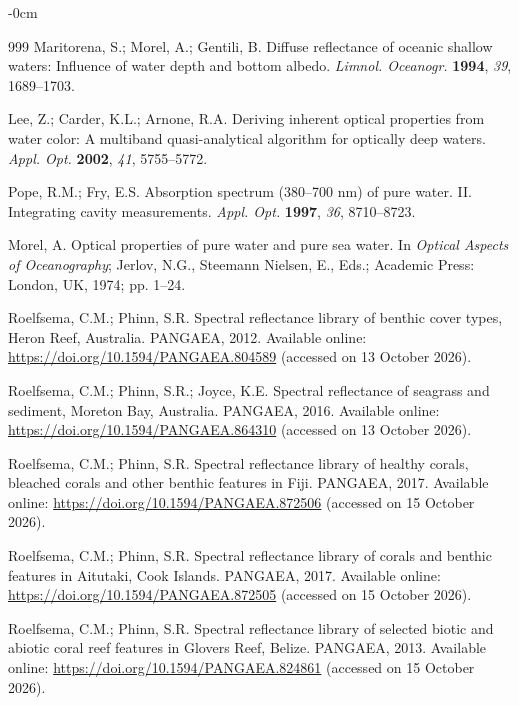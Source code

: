 \documentclass[remotesensing,article,submit,pdftex]{Definitions/mdpi}
\begin{document}
\begin{adjustwidth}{-\extralength}{0cm}
\begin{thebibliography}{999}
Maritorena, S.; Morel, A.; Gentili, B. Diffuse reflectance of oceanic shallow waters: Influence of water depth and bottom albedo. {\em Limnol. Oceanogr.} {\bf 1994}, {\em 39}, 1689--1703.

Lee, Z.; Carder, K.L.; Arnone, R.A. Deriving inherent optical properties from water color: A multiband quasi-analytical algorithm for optically deep waters. {\em Appl. Opt.} {\bf 2002}, {\em 41}, 5755--5772.

Pope, R.M.; Fry, E.S. Absorption spectrum (380--700 nm) of pure water. II. Integrating cavity measurements. {\em Appl. Opt.} {\bf 1997}, {\em 36}, 8710--8723.

Morel, A. Optical properties of pure water and pure sea water. In {\em Optical Aspects of Oceanography}; Jerlov, N.G., Steemann Nielsen, E., Eds.; Academic Press: London, UK, 1974; pp. 1--24.

Roelfsema, C.M.; Phinn, S.R. Spectral reflectance library of benthic cover types, Heron Reef, Australia. PANGAEA, 2012. Available online: \url{https://doi.org/10.1594/PANGAEA.804589} (accessed on 13 October 2026).

Roelfsema, C.M.; Phinn, S.R.; Joyce, K.E. Spectral reflectance of seagrass and sediment, Moreton Bay, Australia. PANGAEA, 2016. Available online: \url{https://doi.org/10.1594/PANGAEA.864310} (accessed on 13 October 2026).

Roelfsema, C.M.; Phinn, S.R. Spectral reflectance library of healthy corals, bleached corals and other benthic features in Fiji. PANGAEA, 2017. Available online: \url{https://doi.org/10.1594/PANGAEA.872506} (accessed on 15 October 2026).

Roelfsema, C.M.; Phinn, S.R. Spectral reflectance library of corals and benthic features in Aitutaki, Cook Islands. PANGAEA, 2017. Available online: \url{https://doi.org/10.1594/PANGAEA.872505} (accessed on 15 October 2026).

Roelfsema, C.M.; Phinn, S.R. Spectral reflectance library of selected biotic and abiotic coral reef features in Glovers Reef, Belize. PANGAEA, 2013. Available online: \url{https://doi.org/10.1594/PANGAEA.824861} (accessed on 15 October 2026).


\end{thebibliography}
\end{adjustwidth}
\end{document}
